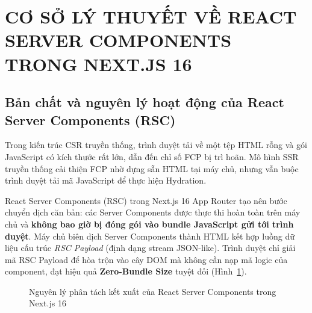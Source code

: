 \documentclass[12pt,a4paper]{extarticle}
\begin{document}
\section{CƠ SỞ LÝ THUYẾT VỀ REACT SERVER COMPONENTS TRONG NEXT.JS 16}

\subsection{Bản chất và nguyên lý hoạt động của React Server Components (RSC)}
Trong kiến trúc CSR truyền thống, trình duyệt tải về một tệp HTML rỗng và gói JavaScript có kích thước rất lớn, dẫn đến chỉ số FCP bị trì hoãn. Mô hình SSR truyền thống cải thiện FCP nhờ dựng sẵn HTML tại máy chủ, nhưng vẫn buộc trình duyệt tải mã JavaScript để thực hiện Hydration.

React Server Components (RSC) trong Next.js 16 App Router tạo nên bước chuyển dịch căn bản: các Server Components được thực thi hoàn toàn trên máy chủ và \textbf{không bao giờ bị đóng gói vào bundle JavaScript gửi tới trình duyệt}. Máy chủ biên dịch Server Components thành HTML kết hợp luồng dữ liệu cấu trúc \textit{RSC Payload} (định dạng stream JSON-like). Trình duyệt chỉ giải mã RSC Payload để hòa trộn vào cây DOM mà không cần nạp mã logic của component, đạt hiệu quả \textbf{Zero-Bundle Size} tuyệt đối (Hình~\ref{fig:rsc-model}).

\begin{figure}[H]
\centering
{}
\caption{Nguyên lý phân tách kết xuất của React Server Components trong Next.js 16}
\label{fig:rsc-model}
\end{figure}
\end{document}
